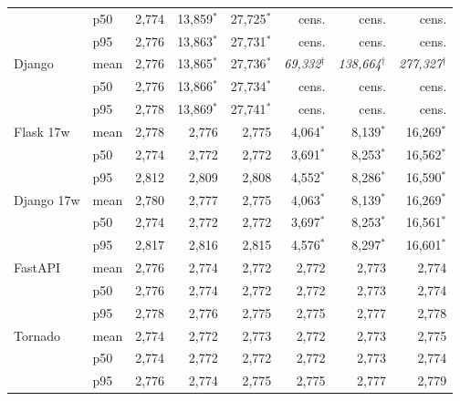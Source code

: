 \begin{table}[!htbp]
\begin{tabular}{@{}llrrrrrr@{}}
     & p50 & 2,774 & 13,859$^*$ & 27,725$^*$ & cens. & cens. & cens. \\
     & p95 & 2,776 & 13,863$^*$ & 27,731$^*$ & cens. & cens. & cens. \\
    \addlinespace
    Django & mean & 2,776 & 13,865$^*$ & 27,736$^*$ & \textit{69,332}$^\dagger$ & \textit{138,664}$^\dagger$ & \textit{277,327}$^\dagger$ \\
     & p50 & 2,776 & 13,866$^*$ & 27,734$^*$ & cens. & cens. & cens. \\
     & p95 & 2,778 & 13,869$^*$ & 27,741$^*$ & cens. & cens. & cens. \\
    \addlinespace
    Flask 17w & mean & 2,778 & 2,776 & 2,775 & 4,064$^*$ & 8,139$^*$ & 16,269$^*$ \\
     & p50 & 2,774 & 2,772 & 2,772 & 3,691$^*$ & 8,253$^*$ & 16,562$^*$ \\
     & p95 & 2,812 & 2,809 & 2,808 & 4,552$^*$ & 8,286$^*$ & 16,590$^*$ \\
    \addlinespace
    Django 17w & mean & 2,780 & 2,777 & 2,775 & 4,063$^*$ & 8,139$^*$ & 16,269$^*$ \\
     & p50 & 2,774 & 2,772 & 2,772 & 3,697$^*$ & 8,253$^*$ & 16,561$^*$ \\
     & p95 & 2,817 & 2,816 & 2,815 & 4,576$^*$ & 8,297$^*$ & 16,601$^*$ \\
    \addlinespace
    FastAPI & mean & 2,776 & 2,774 & 2,772 & 2,772 & 2,773 & 2,774 \\
     & p50 & 2,776 & 2,774 & 2,772 & 2,772 & 2,773 & 2,774 \\
     & p95 & 2,778 & 2,776 & 2,775 & 2,775 & 2,777 & 2,778 \\
    \addlinespace
    Tornado & mean & 2,774 & 2,772 & 2,773 & 2,772 & 2,773 & 2,775 \\
     & p50 & 2,774 & 2,772 & 2,772 & 2,772 & 2,773 & 2,774 \\
     & p95 & 2,776 & 2,774 & 2,775 & 2,775 & 2,777 & 2,779 \\
    
    \bottomrule
  \end{tabular}
\end{table}
